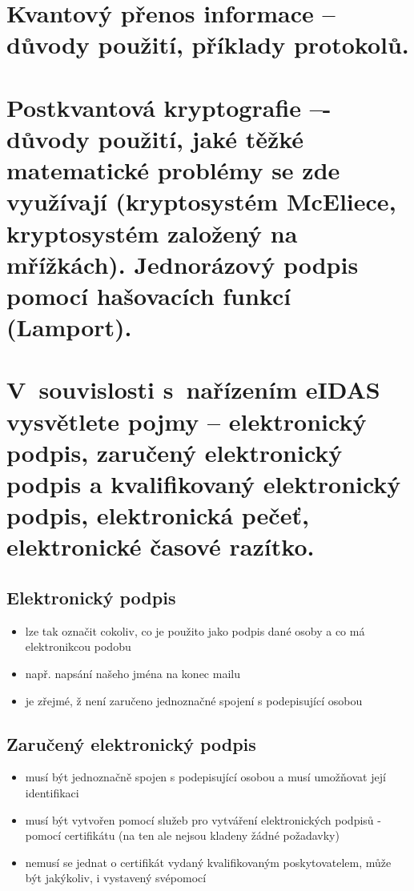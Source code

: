 \clearpage
\section{Kvantový přenos informace -- důvody použití, příklady protokolů.}

\clearpage
\section{Postkvantová kryptografie –- důvody použití, jaké těžké matematické problémy se zde využívají (kryptosystém McEliece, kryptosystém založený na mřížkách). Jednorázový podpis pomocí hašovacích funkcí (Lamport).}

\clearpage
\section{V~souvislosti s~nařízením eIDAS vysvětlete pojmy -- elektronický podpis, zaručený elektronický podpis a kvalifikovaný elektronický podpis, elektronická pečeť, elektronické časové razítko.}
\subsection{Elektronický podpis}
\begin{itemize}
    \item lze tak označit cokoliv, co je použito  jako podpis dané osoby a co má elektronikcou podobu
    \item např. napsání našeho jména na konec mailu
    \item je zřejmé, ž není zaručeno jednoznačné spojení s podepisující osobou
\end{itemize}

\subsection{Zaručený elektronický podpis}
\begin{itemize}
    \item musí být jednoznačně spojen s podepisující osobou a musí umožňovat její identifikaci
    \item musí být vytvořen pomocí služeb pro vytváření elektronických podpisů - pomocí certifikátu (na ten ale nejsou kladeny žádné požadavky)
    \item nemusí se jednat o certifikát vydaný kvalifikovaným poskytovatelem, může být jakýkoliv, i vystavený svépomocí
\end{itemize}


